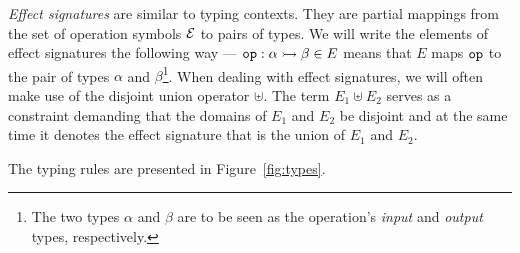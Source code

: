 \documentclass{llncs}
\begin{document}
\emph{Effect signatures} are similar to typing contexts. They are partial
mappings from the set of operation symbols $\mathcal{E}$ to pairs of types. We will
write the elements of effect signatures the following way ---
$\mathtt{op} : \alpha \rightarrowtail \beta \in E$ means that $E$ maps $\mathtt{op}$ to the
pair of types $\alpha$ and $\beta$\footnote{The two types $\alpha$ and
  $\beta$ are to be seen as the operation's \emph{input} and \emph{output}
  types, respectively.}. When dealing with effect signatures, we will often
make use of the disjoint union operator $\uplus$. The term $E_1 \uplus E_2$
serves as a constraint demanding that the domains of $E_1$ and $E_2$ be
disjoint and at the same time it denotes the effect signature that is the
union of $E_1$ and $E_2$.

The typing rules are presented in Figure~\ref{fig:types}.

\newcommand{\handlerrule}{
 \begin{prooftree}
  \AxiomC{$E = \{\typedopg{\op{op}_i}{\alpha_i}{\beta_i}\}_{i \in I} \uplus E_{\mathrm{f}}$}
  \noLine
  \def\extraVskip{0pt}
  \UnaryInfC{$E' = E'' \uplus E_{\mathrm{f}}$}
  \noLine
  \UnaryInfC{$[\Gamma \vdash M_i : \alpha_i \to (\beta_i \to
    \FF_{E'}(\delta)) \to \FF_{E'}(\delta)]_{i \in I}$}
  \noLine
  \UnaryInfC{$\Gamma \vdash M_\eta : \gamma \to \FF_{E'}(\delta)$}
  \noLine
  \UnaryInfC{$\Gamma \vdash N : \FF_{E}(\gamma)$}
  \def\extraVskip{2pt}
  \RightLabel{[$\banana{}$]}
  \UnaryInfC{$\Gamma \vdash \ap{\cibanana}{N} : \FF_{E'}(\delta)$}
 \end{prooftree}}
\end{document}
